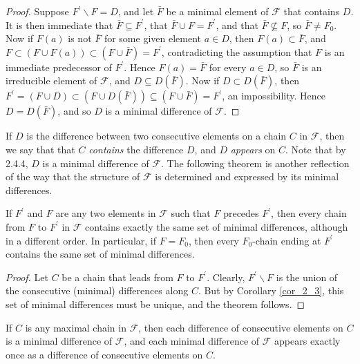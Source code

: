  \begin{proof}
 Suppose $F^{\prime} \backslash F=D$, and let $\bar{F}$ be a minimal element of $\mathcal{F}$ that contains $D$. It is then immediate that $\bar{F} \subseteq F^{\prime}$, that $\bar{F} \cup F=F^{\prime}$, and that $\bar{F} \nsubseteq F$, so $\bar{F} \neq F_0$. Now if $F(a)$ is not $\bar{F}$ for some given element $a \in D$, then $F(a) \subset \bar{F}$, and $F \subset(F \cup F(a)) \subset(F \cup \bar{F})=F^{\prime}$, contradicting the assumption that $F$ is an immediate predecessor of $F^{\prime}$. Hence $F(a)=\bar{F}$ for every $a \in D$, so $\bar{F}$ is an irreducible element of $\mathcal{F}$, and $D \subseteq D(\bar{F})$. Now if $D \subset D(\bar{F})$, then $F^{\prime}=(F \cup D) \subset(F \cup D(\bar{F})) \subseteq(F \cup \bar{F})=F^{\prime}$, an impossibility. Hence $D=D(\bar{F})$, and so $D$ is a minimal difference of $\mathcal{F}$.
\end{proof}

If $D$ is the difference between two consecutive elements on a chain $C$ in $\mathcal{F}$, then we say that that $C$ \textit{contains} the difference $D$, and $D$ \textit{appears} on $C$. Note that by 2.4.4, $D$ is a minimal difference of $\mathcal{F}$. The following theorem is another reflection of the way that the structure of $\mathcal{F}$ is determined and expressed by its minimal differences.

\begin{theorem}\label{thm_2_1}
If $F^{\prime}$ and $F$ are any two elements in $\mathcal{F}$ such that $F$ precedes $F^{\prime}$, then every chain from $F$ to $F^{\prime}$ in $\mathcal{F}$ contains exactly the same set of minimal differences, although in a different order. In particular, if $F=F_0$, then every $F_0$-chain ending at $F^{\prime}$ contains the same set of minimal differences.
\end{theorem}

\begin{proof}
    Let $C$ be a chain that leads from $F$ to $F^{\prime}$. Clearly, $F^{\prime} \backslash F$ is the union of the consecutive (minimal) differences along $C$. But by Corollary \ref{cor_2_3}, this set of minimal differences must be unique, and the theorem follows.
\end{proof}

\begin{corollary}\label{cor_2_5}
If $C$ is any maximal chain in $\mathcal{F}$, then each difference of consecutive elements on $C$ is a minimal difference of $\mathcal{F}$, and each minimal difference of $\mathcal{F}$ appears exactly once as a difference of consecutive elements on $C$.
\end{corollary}

